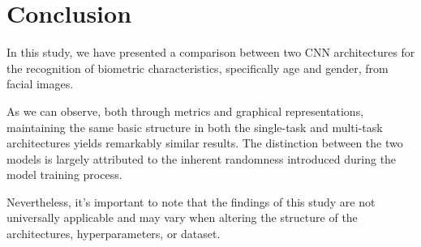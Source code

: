 \section{Conclusion} \label{sec:conclusions}
In this study, we have presented a comparison between two CNN
architectures for the recognition of biometric characteristics,
specifically age and gender, from facial images.

As we can observe, both through metrics and graphical representations,
maintaining the same basic structure in both the single-task and multi-task
architectures yields remarkably similar results.
The distinction between the two models is largely attributed to the
inherent randomness introduced during the model training process.

Nevertheless, it's important to note that the findings of this study
are not universally applicable and may vary when altering the
structure of the architectures, hyperparameters, or dataset.